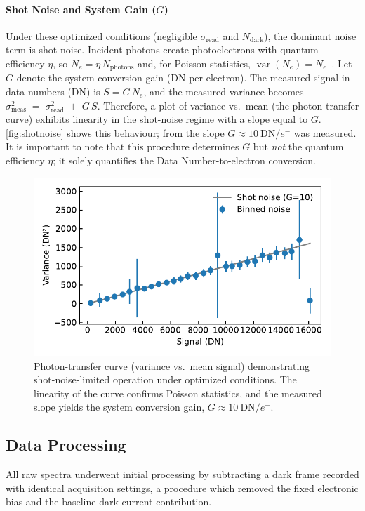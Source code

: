 \documentclass[
	a4paper,
]{scrarticle}
\begin{document}
\paragraph{Shot Noise and System Gain ($G$)}
Under these optimized conditions (negligible $\sigma_{\text{read}}$ and $N_{\text{dark}}$), the dominant noise term is shot noise.
Incident photons create photoelectrons with quantum efficiency \(\eta\), so \(N_e=\eta\,N_{\text{photons}}\) and, for Poisson statistics, \(\operatorname{var}(N_e)=N_e\)~\cite{europeanmachinevisionassociationStandardCharacterizationImage2010}.
Let \(G\) denote the system conversion gain ($\text{DN}$ per electron). The measured signal in data numbers ($\text{DN}$) is \(S = G\,N_e\), and the measured variance becomes \(\sigma^2_{\text{meas}} \;=\; \sigma_{\text{read}}^2 \;+\; G\,S\).
Therefore, a plot of variance vs.\ mean (the photon-transfer curve) exhibits linearity in the shot-noise regime with a slope equal to $G$.
\autoref{fig:shotnoise} shows this behaviour; from the slope \(G \approx 10~\text{DN}/e^{-}\) was measured.
It is important to note that this procedure determines $G$ but \emph{not} the quantum efficiency $\eta$; it solely quantifies the Data Number-to-electron conversion.

\begin{figure}[h]
    \centering
    \includegraphics{../analysis/figures/shot noise.pdf}
    \caption{Photon-transfer curve (variance vs.\ mean signal) demonstrating shot-noise-limited operation under optimized conditions. The linearity of the curve confirms Poisson statistics, and the measured slope yields the system conversion gain, $G \approx 10~\text{DN}/e^{-}$.}
    \label{fig:shotnoise}
\end{figure}

\subsection{Data Processing}
All raw spectra underwent initial processing by subtracting a dark frame recorded with identical acquisition settings, a procedure which removed the fixed electronic bias and the baseline dark current contribution.
\end{document}
